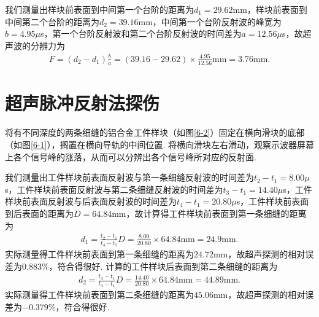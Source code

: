 \documentclass[UTF8,10pt,a4paper]{article}
\begin{document}
我们测量出样块前表面到中间第一个台阶的距离为$d_1=29.62$mm，样块前表面到中间第二个台阶的距离为$d_2=39.16$mm，中间第一个台阶反射波的峰宽为$b=4.95\mu$s，第一个台阶反射波和第二个台阶反射波的时间差为$a=12.56\mu$s，故超声波的分辨力为
\begin{align}
    F=(d_2-d_1)\frac{b}{a}=(39.16-29.62)\times\frac{4.95}{12.56}\text{mm}=3.76\text{mm}.
\end{align}

\section{超声脉冲反射法探伤}
将有不同深度的两条细缝的铝合金工件样块（如图\ref{6-2}）固定在横向滑块的底部（如图\ref{6-1}），搁置在横向导轨的中间位置. 将横向滑块左右滑动，观察示波器屏幕上各个信号峰的涨落，从而可以分辨出各个信号峰所对应的反射面.

\begin{figure}[h]
	\centering
\end{figure}

我们测量出工件样块前表面反射波与第一条细缝反射波的时间差为$t_2-t_1=8.00\mu$s，工件样块前表面反射波与第二条细缝反射波的时间差为$t_3-t_1=14.40\mu$s，工件样块前表面反射波与后表面反射波的时间差为$t_4-t_1=20.80\mu$s，工件样块前表面到后表面的距离为$D=64.84$mm，故计算得工件样块前表面到第一条细缝的距离为
\begin{align}
    d_1=\frac{t_2-t_1}{t_4-t_1}D=\frac{8.00}{20.80}\times 64.84\text{mm}=24.9\text{mm}.
\end{align}
实际测量得工件样块前表面到第一条细缝的距离为$24.72$mm，故超声探测的相对误差为$0.883\%$，符合得很好. 计算的工件样块后表面到第二条细缝的距离为
\begin{align}
    d_2=\frac{t_3-t_1}{t_4-t_1}D=\frac{14.40}{20.80}\times 64.84\text{mm}=44.89\text{mm}.
\end{align}
实际测量得工件样块前表面到第二条细缝的距离为$45.06$mm，故超声探测的相对误差为$-0.379\%$，符合得很好.
\end{document}
